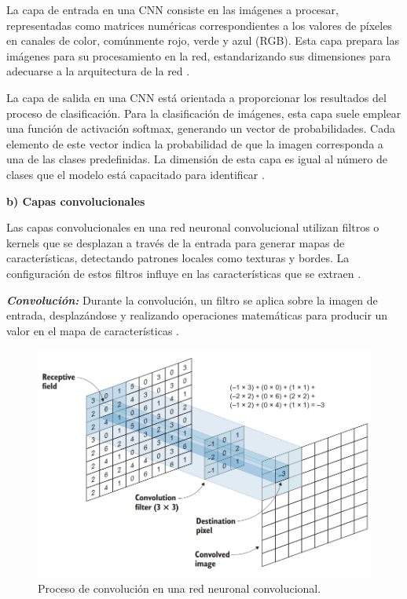 La capa de entrada en una CNN consiste en las imágenes a procesar, representadas como matrices numéricas correspondientes a los valores de píxeles en canales de color, comúnmente rojo, verde y azul (RGB). Esta capa prepara las imágenes para su procesamiento en la red, estandarizando sus dimensiones para adecuarse a la arquitectura de la red \cite{rashid2016make, geron2019hands}.

La capa de salida en una CNN está orientada a proporcionar los resultados del proceso de clasificación. Para la clasificación de imágenes, esta capa suele emplear una función de activación softmax, generando un vector de probabilidades. Cada elemento de este vector indica la probabilidad de que la imagen corresponda a una de las clases predefinidas. La dimensión de esta capa es igual al número de clases que el modelo está capacitado para identificar \cite{geron2019hands}.

\textbf{b) Capas convolucionales}

Las capas convolucionales en una red neuronal convolucional utilizan filtros o kernels que se desplazan a través de la entrada para generar mapas de características, detectando patrones locales como texturas y bordes. La configuración de estos filtros influye en las características que se extraen \cite{rashid2016make, geron2019hands}.

\textbf{\textit{Convolución:}} Durante la convolución, un filtro se aplica sobre la imagen de entrada, desplazándose y realizando operaciones matemáticas para producir un valor en el mapa de características \cite{aghdam2017guide}.

\begin{figure}[H]
    \begin{center}
        \includegraphics[width=\textwidth]{Images/CapaConvolucion.png}
    \end{center}
    \caption{Proceso de convolución en una red neuronal convolucional.}
    \label{fig:CapaConvolucion}
\end{figure}

